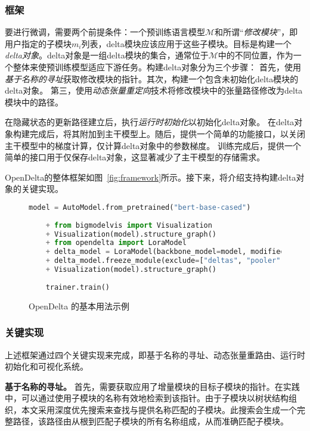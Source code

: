 \subsubsection{框架}

要进行微调，需要两个前提条件：一个预训练语言模型$\mathcal{M}$和所谓“\textit{修改模块}”，即用户指定的子模块$m_i$列表，delta模块应该应用于这些子模块。目标是构建一个\textit{delta对象}。delta对象是一组delta模块的集合，通常位于$\mathcal{M}$中的不同位置，作为一个整体来使预训练模型适应下游任务。构建delta对象分为三个步骤：
首先，使用\textit{基于名称的寻址}获取修改模块的指针。其次，构建一个包含未初始化delta模块的delta对象。
第三，使用\textit{动态张量重定向}技术将修改模块中的张量路径修改为delta模块中的路径。

在隐藏状态的更新路径建立后，执行\textit{运行时初始化}以初始化delta对象。
在delta对象构建完成后，将其附加到主干模型上。随后，提供一个简单的功能接口，以关闭主干模型中的梯度计算，仅计算delta对象中的参数梯度。
训练完成后，提供一个简单的接口用于仅保存delta对象，这显著减少了主干模型的存储需求。

OpenDelta的整体框架如图~\ref{fig:framework}所示。接下来，将介绍支持构建delta对象的关键实现。


\begin{figure}
    \centering
    \begin{minipage}{0.96\textwidth}
    \begin{lstlisting}[language=Python]
    model = AutoModel.from_pretrained("bert-base-cased")
    
    + from bigmodelvis import Visualization
    + Visualization(model).structure_graph()
    + from opendelta import LoraModel
    + delta_model = LoraModel(backbone_model=model, modified_modules=["output.dense", "query"])
    + delta_model.freeze_module(exclude=["deltas", "pooler"], set_state_dict=True)
    + Visualization(model).structure_graph()
    
    trainer.train()
    \end{lstlisting}
    \end{minipage} 
    \caption{OpenDelta 的基本用法示例}
    \label{fig:basic_usage} 
\end{figure}


\subsubsection{关键实现}
上述框架通过四个关键实现来完成，即基于名称的寻址、动态张量重路由、运行时初始化和可视化系统。

\textbf{基于名称的寻址。} 首先，需要获取应用了增量模块的目标子模块的指针。在实践中，可以通过使用子模块的名称有效地检索到该指针。由于子模块以树状结构组织，本文采用深度优先搜索来查找与提供名称匹配的子模块。此搜索会生成一个完整路径，该路径由从根到匹配子模块的所有名称组成，从而准确匹配子模块。

